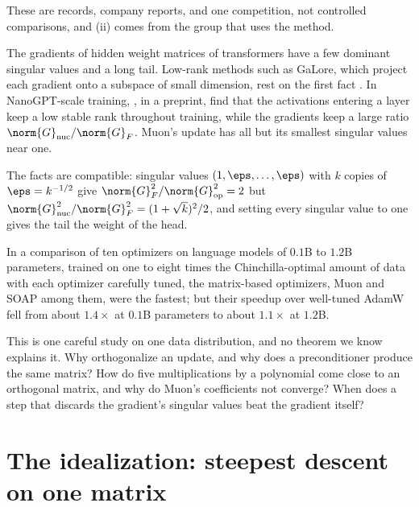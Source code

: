 \begin{refsection}
These are records, company reports, and one competition, not controlled comparisons, and (ii) comes from the group that uses the method.

\begin{observation}\label{obs:spectral:shape}
The gradients of hidden weight matrices of transformers have a few dominant singular values and a long tail. Low-rank methods such as GaLore, which project each gradient onto a subspace of small dimension, rest on the first fact \parencite{ZhaoEtAl2024GaLore}. In NanoGPT-scale training, \textcite{DavisDrusvyatskiy2025}, in a preprint, find that the activations entering a layer keep a low stable rank throughout training, while the gradients keep a large ratio $\norm{G}_{\nuc}/\norm{G}_F$. Muon's update has all but its smallest singular values near one.
\end{observation}

The facts are compatible: singular values $(1,\eps,\dots,\eps)$ with $k$ copies of $\eps=k^{-1/2}$ give $\norm{G}_F^2/\norm{G}_{\op}^2=2$ but $\norm{G}_{\nuc}^2/\norm{G}_F^2=(1+\sqrt k)^2/2$, and setting every singular value to one gives the tail the weight of the head.

\begin{observation}\label{obs:spectral:shrink}
In a comparison of ten optimizers on language models of $0.1$B to $1.2$B parameters, trained on one to eight times the Chinchilla-optimal amount of data with each optimizer carefully tuned, the matrix-based optimizers, Muon and SOAP among them, were the fastest; but their speedup over well-tuned AdamW fell from about $1.4\times$ at $0.1$B parameters to about $1.1\times$ at $1.2$B.
\end{observation}

This is one careful study on one data distribution, and no theorem we know explains it. Why orthogonalize an update, and why does a preconditioner produce the same matrix? How do five multiplications by a polynomial come close to an orthogonal matrix, and why do Muon's coefficients not converge? When does a step that discards the gradient's singular values beat the gradient itself?

\section{The idealization: steepest descent on one matrix}\label{sec:spectral:model}


\end{refsection}
